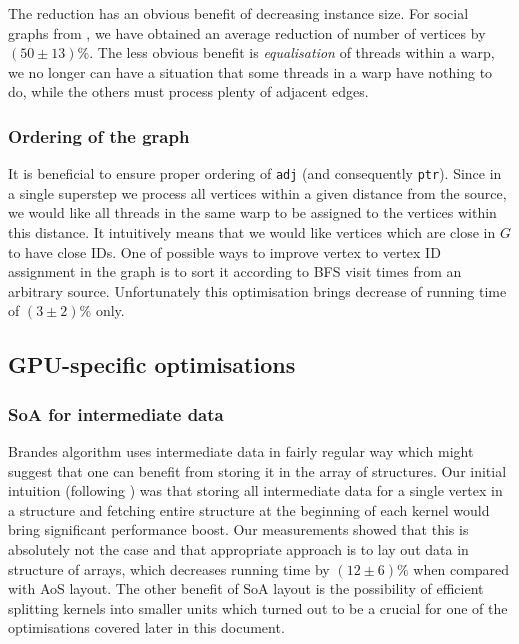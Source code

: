 The reduction has an obvious benefit of decreasing instance size.
For social graphs from \cite{Snap}, we have obtained an average reduction of number of vertices by $(50 \pm 13) \%$.
The less obvious benefit is \emph{equalisation} of threads within a warp, we no longer can have a situation that some threads in a warp have nothing to do, while the others must process plenty of adjacent edges.

\subsubsection*{Ordering of the graph}

It is beneficial to ensure proper ordering of \verb+adj+ (and consequently \verb+ptr+).
Since in a single superstep we process all vertices within a given distance from the source, we would like all threads in the same warp to be assigned to the vertices within this distance.
It intuitively means that we would like vertices which are close in $G$ to have close IDs.
One of possible ways to improve vertex to vertex ID assignment in the graph is to sort it according to BFS visit times from an arbitrary source.
Unfortunately this optimisation brings decrease of running time of $(3 \pm 2) \%$ only.

\subsection*{GPU-specific optimisations}

\subsubsection*{SoA for intermediate data}

Brandes algorithm uses intermediate data in fairly regular way which might suggest that one can benefit from storing it in the array of structures.
Our initial intuition (following \cite{GlobMem}) was that storing all intermediate data for a single vertex in a structure and fetching entire structure at the beginning of each kernel would bring significant performance boost.
Our measurements showed that this is absolutely not the case and that appropriate approach is to lay out data in structure of arrays, which decreases running time by $(12 \pm 6) \%$ when compared with AoS layout.
The other benefit of SoA layout is the possibility of efficient splitting kernels into smaller units which turned out to be a crucial for one of the optimisations covered later in this document.

